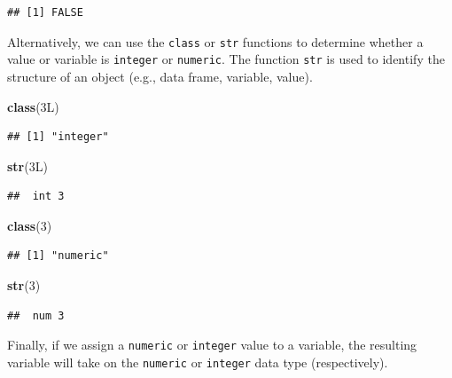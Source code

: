 \documentclass[]{book}
\newenvironment{Shaded}{\begin{snugshade}}{\end{snugshade}}
\newcommand{\KeywordTok}[1]{\textcolor[rgb]{0.13,0.29,0.53}{\textbf{#1}}}
\newcommand{\DecValTok}[1]{\textcolor[rgb]{0.00,0.00,0.81}{#1}}
\newcommand{\NormalTok}[1]{#1}
\begin{document}
\begin{verbatim}
## [1] FALSE
\end{verbatim}

Alternatively, we can use the \texttt{class} or \texttt{str} functions
to determine whether a value or variable is \texttt{integer} or
\texttt{numeric}. The function \texttt{str} is used to identify the
structure of an object (e.g., data frame, variable, value).

\begin{Shaded}
\begin{Highlighting}[]
\KeywordTok{class}\NormalTok{(3L)}
\end{Highlighting}
\end{Shaded}

\begin{verbatim}
## [1] "integer"
\end{verbatim}

\begin{Shaded}
\begin{Highlighting}[]
\KeywordTok{str}\NormalTok{(3L)}
\end{Highlighting}
\end{Shaded}

\begin{verbatim}
##  int 3
\end{verbatim}

\begin{Shaded}
\begin{Highlighting}[]
\KeywordTok{class}\NormalTok{(}\DecValTok{3}\NormalTok{)}
\end{Highlighting}
\end{Shaded}

\begin{verbatim}
## [1] "numeric"
\end{verbatim}

\begin{Shaded}
\begin{Highlighting}[]
\KeywordTok{str}\NormalTok{(}\DecValTok{3}\NormalTok{)}
\end{Highlighting}
\end{Shaded}

\begin{verbatim}
##  num 3
\end{verbatim}

Finally, if we assign a \texttt{numeric} or \texttt{integer} value to a
variable, the resulting variable will take on the \texttt{numeric} or
\texttt{integer} data type (respectively).
\end{document}
